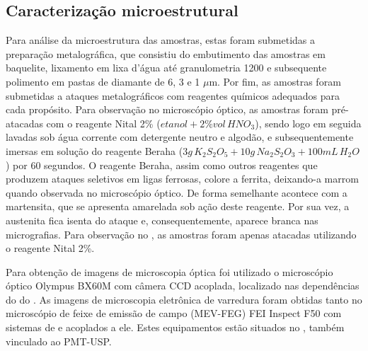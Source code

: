 \subsection{Caracteriza\c{c}\~{a}o microestrutural}

Para análise da microestrutura das amostras, estas foram submetidas a preparação metalográfica, que consistiu do embutimento das amostras em baquelite, lixamento em lixa d'água até granulometria 1200 e subsequente polimento em pastas de diamante de 6, 3 e 1 $\mu$m. Por fim, as amostras foram submetidas a ataques metalográficos com reagentes químicos adequados para cada propósito. Para observação no microscópio óptico, as amostras foram pré-atacadas com o reagente Nital 2\% ($etanol + 2\%vol\,HNO_3$), sendo logo em seguida lavadas sob água corrente com detergente neutro e algodão, e subsequentemente imersas em solução do reagente Beraha ($3g\,K_2S_2O_5 + 10g\,Na_2S_2O_3 + 100mL\,H_2O$) por 60 segundos. O reagente Beraha, assim como outros reagentes que produzem ataques seletivos em ligas ferrosas, colore a ferrita, deixando-a marrom quando observada no microscópio óptico. De forma semelhante acontece com a martensita, que se apresenta amarelada sob ação deste reagente. Por sua vez, a austenita fica isenta do ataque e, consequentemente, aparece branca nas micrografias\cite{MetalsVol9}. Para observação no , as amostras foram apenas atacadas utilizando o reagente Nital 2\%.

Para obtenção de imagens de microscopia óptica foi utilizado o microscópio óptico Olympus BX60M com câmera CCD acoplada, localizado nas dependências do  do . As imagens de microscopia eletrônica de varredura foram obtidas tanto no microscópio de feixe de emissão de campo (MEV-FEG) FEI Inspect F50 com sistemas de  e  acoplados a ele. Estes equipamentos estão situados no , também vinculado ao PMT-USP.

